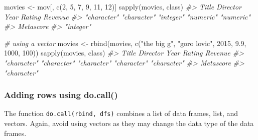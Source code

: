 \documentclass[
]{book}
\newenvironment{Shaded}{\begin{snugshade}}{\end{snugshade}}
\newcommand{\CommentTok}[1]{\textcolor[rgb]{0.56,0.35,0.01}{\textit{#1}}}
\newcommand{\DecValTok}[1]{\textcolor[rgb]{0.00,0.00,0.81}{#1}}
\newcommand{\FloatTok}[1]{\textcolor[rgb]{0.00,0.00,0.81}{#1}}
\newcommand{\FunctionTok}[1]{\textcolor[rgb]{0.00,0.00,0.00}{#1}}
\newcommand{\NormalTok}[1]{#1}
\newcommand{\OtherTok}[1]{\textcolor[rgb]{0.56,0.35,0.01}{#1}}
\newcommand{\StringTok}[1]{\textcolor[rgb]{0.31,0.60,0.02}{#1}}
\begin{document}
\begin{Shaded}
\begin{Highlighting}[]
\NormalTok{movies }\OtherTok{\textless{}{-}}\NormalTok{ mov[, }\FunctionTok{c}\NormalTok{(}\DecValTok{2}\NormalTok{, }\DecValTok{5}\NormalTok{, }\DecValTok{7}\NormalTok{, }\DecValTok{9}\NormalTok{, }\DecValTok{11}\NormalTok{, }\DecValTok{12}\NormalTok{)]}
\FunctionTok{sapply}\NormalTok{(movies, class)}
\CommentTok{\#\textgreater{}       Title    Director        Year      Rating     Revenue }
\CommentTok{\#\textgreater{} "character" "character"   "integer"   "numeric"   "numeric" }
\CommentTok{\#\textgreater{}   Metascore }
\CommentTok{\#\textgreater{}   "integer"}

\CommentTok{\# using a vector}
\NormalTok{movies }\OtherTok{\textless{}{-}} \FunctionTok{rbind}\NormalTok{(movies, }\FunctionTok{c}\NormalTok{(}\StringTok{"the big g"}\NormalTok{, }\StringTok{"goro lovic"}\NormalTok{, }\DecValTok{2015}\NormalTok{, }\FloatTok{9.9}\NormalTok{, }\DecValTok{1000}\NormalTok{, }\DecValTok{100}\NormalTok{))}
\FunctionTok{sapply}\NormalTok{(movies, class)}
\CommentTok{\#\textgreater{}       Title    Director        Year      Rating     Revenue }
\CommentTok{\#\textgreater{} "character" "character" "character" "character" "character" }
\CommentTok{\#\textgreater{}   Metascore }
\CommentTok{\#\textgreater{} "character"}
\end{Highlighting}
\end{Shaded}

\hypertarget{adding-rows-using-do.call}{%
\subsubsection{Adding rows using do.call()}\label{adding-rows-using-do.call}}

The function \texttt{do.call(\textquotesingle{}rbind\textquotesingle{},\ dfs)} combines a list of data frames, list, and vectors. Again, avoid using vectors as they may change the data type of the data frames.
\end{document}
